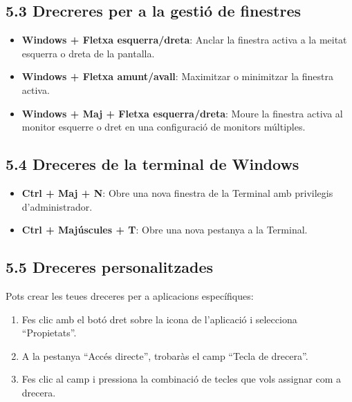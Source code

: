\documentclass[
  a4paper,
]{article}
\providecommand{\tightlist}{%
  \setlength{\itemsep}{0pt}\setlength{\parskip}{0pt}}
\begin{document}
\subsection{5.3 Drecreres per a la gestió de
finestres}\label{drecreres-per-a-la-gestiuxf3-de-finestres}

\begin{itemize}
\tightlist
\item
  \textbf{Windows + Fletxa esquerra/dreta}: Anclar la finestra activa a
  la meitat esquerra o dreta de la pantalla.
\item
  \textbf{Windows + Fletxa amunt/avall}: Maximitzar o minimitzar la
  finestra activa.
\item
  \textbf{Windows + Maj + Fletxa esquerra/dreta}: Moure la finestra
  activa al monitor esquerre o dret en una configuració de monitors
  múltiples.
\end{itemize}

\subsection{5.4 Dreceres de la terminal de
Windows}\label{dreceres-de-la-terminal-de-windows}

\begin{itemize}
\tightlist
\item
  \textbf{Ctrl + Maj + N}: Obre una nova finestra de la Terminal amb
  privilegis d'administrador.
\item
  \textbf{Ctrl + Majúscules + T}: Obre una nova pestanya a la Terminal.
\end{itemize}

\subsection{5.5 Dreceres
personalitzades}\label{dreceres-personalitzades}

Pots crear les teues dreceres per a aplicacions específiques:

\begin{enumerate}
\def\labelenumi{\arabic{enumi}.}
\tightlist
\item
  Fes clic amb el botó dret sobre la icona de l'aplicació i selecciona
  ``Propietats''.
\item
  A la pestanya ``Accés directe'', trobaràs el camp ``Tecla de
  drecera''.
\item
  Fes clic al camp i pressiona la combinació de tecles que vols assignar
  com a drecera.
\end{enumerate}
\end{document}
